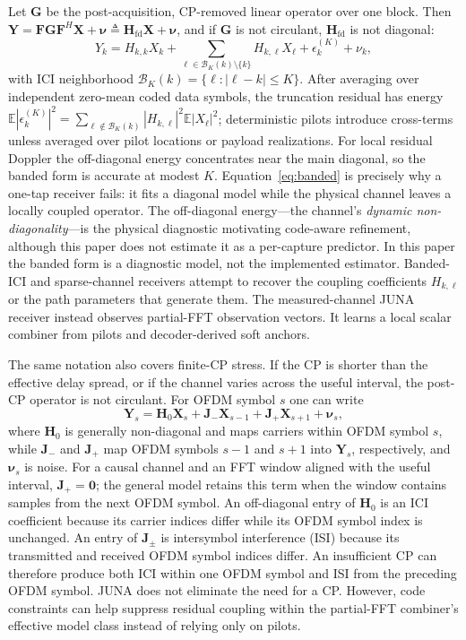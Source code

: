 \documentclass[journal]{IEEEtran}
\newcommand{\E}{\mathbb{E}}
\newcommand{\Ht}{^{H}}
\newcommand{\abs}[1]{\left\lvert #1 \right\rvert}
\newcommand{\juna}{JUNA}
\begin{document}
Let $\mathbf G$ be the post-acquisition, CP-removed linear operator over one
block. Then
$\mathbf Y=\mathbf F\mathbf G\mathbf F\Ht\mathbf X+\bm\nu\triangleq
\mathbf H_{\mathrm{fd}}\mathbf X+\bm\nu$, and if $\mathbf G$ is not circulant,
$\mathbf H_{\mathrm{fd}}$ is not diagonal:
\begin{equation}
  Y_k=H_{k,k}X_k+\!\!\sum_{\ell\in\mathcal B_K(k)\setminus\{k\}}\!\!H_{k,\ell}X_\ell
  +\epsilon_k^{(K)}+\nu_k,
  \label{eq:banded}
\end{equation}
with ICI neighborhood $\mathcal B_K(k)=\{\ell:\abs{\ell-k}\le K\}$. After
averaging over independent zero-mean coded data symbols, the truncation residual
has energy
$\E\abs{\epsilon_k^{(K)}}^2=\sum_{\ell\notin\mathcal B_K(k)}
\abs{H_{k,\ell}}^2\E\abs{X_\ell}^2$; deterministic pilots introduce cross-terms
unless averaged over pilot locations or payload realizations. For local residual
Doppler the off-diagonal energy concentrates near the main diagonal, so the
banded form is accurate at modest $K$. Equation~\eqref{eq:banded} is precisely
why a one-tap receiver
fails: it fits a diagonal model while the physical channel leaves a locally
coupled operator. The off-diagonal energy---the channel's \emph{dynamic
non-diagonality}---is the physical diagnostic motivating code-aware refinement,
although this paper does not estimate it as a per-capture predictor. In this
paper the banded form is a diagnostic model, not the
implemented estimator. Banded-ICI and sparse-channel receivers attempt to recover
the coupling coefficients $H_{k,\ell}$ or the path parameters that generate
them. The measured-channel \juna{} receiver instead observes partial-FFT
observation vectors. It learns a local scalar combiner from pilots and
decoder-derived soft anchors.

The same notation also covers finite-CP stress. If the CP is shorter than the
effective delay spread, or if the channel varies across the useful interval, the
post-CP operator is not circulant. For OFDM symbol $s$ one can write
\begin{equation}
  \mathbf Y_s
  =\mathbf H_0\mathbf X_s
  +\mathbf J_{-}\mathbf X_{s-1}
  +\mathbf J_{+}\mathbf X_{s+1}
  +\bm\nu_s ,
  \label{eq:cp-short}
\end{equation}
where $\mathbf H_0$ is generally non-diagonal and maps carriers within OFDM
symbol $s$, while $\mathbf J_-$ and $\mathbf J_+$ map OFDM symbols $s-1$ and
$s+1$ into $\mathbf Y_s$, respectively, and $\bm\nu_s$ is noise. For a causal
channel and an FFT window aligned with the useful interval,
$\mathbf J_+=\mathbf 0$; the general model retains this term when the window
contains samples from the next OFDM symbol. An off-diagonal entry of
$\mathbf H_0$ is an ICI coefficient because its carrier indices differ while
its OFDM symbol index is unchanged. An entry of $\mathbf J_{\pm}$ is
intersymbol interference (ISI) because its transmitted and received OFDM
symbol indices differ. An insufficient CP can therefore produce both ICI
within one OFDM symbol and ISI from the preceding OFDM symbol. \juna{} does not
eliminate the need for a CP. However, code
constraints can help suppress residual coupling within the partial-FFT
combiner's effective model class instead of relying only on pilots.
\end{document}
